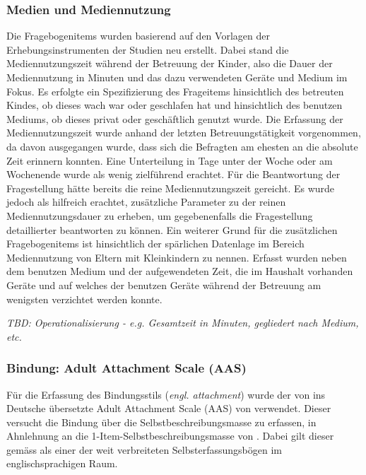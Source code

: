 \subsubsection{Medien und Mediennutzung}\label{sec:MedienMediennutzung}
Die Fragebogenitems wurden basierend auf den Vorlagen der Erhebungsinstrumenten der Studien  neu erstellt. Dabei stand die Mediennutzungszeit während der Betreuung der Kinder, also die Dauer der Mediennutzung in Minuten und das dazu verwendeten Geräte und Medium im Fokus. Es erfolgte ein Spezifizierung des Frageitems hinsichtlich des betreuten Kindes, ob dieses wach war oder geschlafen hat und hinsichtlich des benutzen Mediums, ob dieses privat oder geschäftlich genutzt wurde. Die Erfassung der Mediennutzungszeit wurde anhand der letzten Betreuungstätigkeit vorgenommen, da davon ausgegangen wurde, dass sich die Befragten am ehesten an die absolute Zeit erinnern konnten. Eine Unterteilung in Tage unter der Woche oder am Wochenende wurde als wenig zielführend erachtet. Für die Beantwortung der Fragestellung hätte bereits die reine Mediennutzungszeit gereicht. Es wurde jedoch als hilfreich erachtet, zusätzliche Parameter zu der reinen Mediennutzungsdauer zu erheben, um gegebenenfalls die Fragestellung detaillierter beantworten zu können. Ein weiterer Grund für die zusätzlichen Fragebogenitems ist hinsichtlich der spärlichen Datenlage im Bereich Mediennutzung von Eltern mit Kleinkindern zu nennen. Erfasst wurden neben dem benutzen Medium und der aufgewendeten Zeit, die im Haushalt vorhanden Geräte und auf welches der benutzen Geräte während der Betreuung am wenigsten verzichtet werden konnte. 

\textit{TBD: Operationalisierung - e.g. Gesamtzeit in Minuten, gegliedert nach Medium, etc.}

\subsubsection{Bindung: Adult Attachment Scale (AAS)}\label{sec:AAS}
Für die Erfassung des Bindungsstils (\textit{engl. attachment}) wurde der von  ins Deutsche übersetzte Adult Attachment Scale (AAS) von  verwendet. Dieser versucht die Bindung über die Selbstbeschreibungsmasse zu erfassen, in Ahnlehnung an die 1-Item-Selbstbeschreibungsmasse von . Dabei gilt dieser gemäss  als einer der weit verbreiteten Selbsterfassungsbögen im englischsprachigen Raum.

